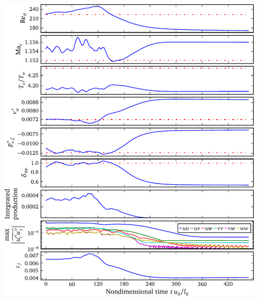 \documentclass[mathserif]{beamer}
\begin{document}
\begin{frame}
\begin{columns}[c,onlytextwidth]
\begin{column}{.65\linewidth}
\begin{flushright}
            \includegraphics[height=0.99\textheight]{relam4134}
        \end{flushright}
    \end{column}
    \end{columns}
\end{frame}
\end{document}
